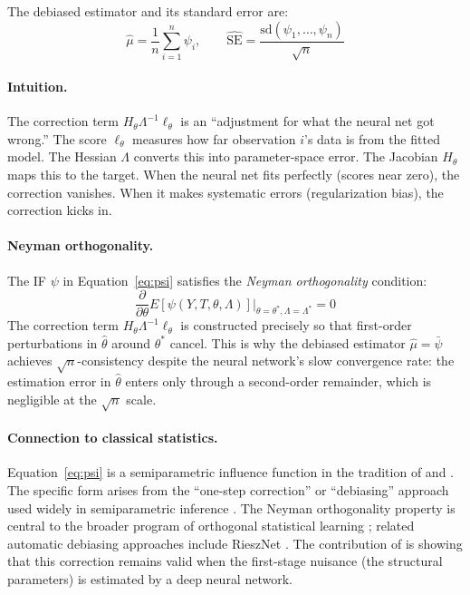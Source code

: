 The debiased estimator and its standard error are:
\begin{equation}\label{eq:mu_hat}
    \hat{\mu} = \frac{1}{n}\sum_{i=1}^n \psi_i, \qquad \widehat{\text{SE}} = \frac{\text{sd}(\psi_1, \ldots, \psi_n)}{\sqrt{n}}
\end{equation}

\paragraph{Intuition.} The correction term $H_{\theta} \Lambda^{-1} \ell_\theta$ is an ``adjustment for what the neural net got wrong.'' The score $\ell_\theta$ measures how far observation $i$'s data is from the fitted model. The Hessian $\Lambda$ converts this into parameter-space error. The Jacobian $H_\theta$ maps this to the target. When the neural net fits perfectly (scores near zero), the correction vanishes. When it makes systematic errors (regularization bias), the correction kicks in.

\paragraph{Neyman orthogonality.} The IF $\psi$ in Equation~\eqref{eq:psi} satisfies the \emph{Neyman orthogonality} condition:
\begin{equation}\label{eq:neyman_orth}
    \frac{\partial}{\partial \theta} E[\psi(Y, T, \theta, \Lambda)] \bigg|_{\theta = \theta^*, \Lambda = \Lambda^*} = 0
\end{equation}
The correction term $H_\theta \Lambda^{-1} \ell_\theta$ is constructed precisely so that first-order perturbations in $\hat{\theta}$ around $\theta^*$ cancel. This is why the debiased estimator $\hat{\mu} = \bar{\psi}$ achieves $\sqrt{n}$-consistency despite the neural network's slow convergence rate: the estimation error in $\hat{\theta}$ enters only through a second-order remainder, which is negligible at the $\sqrt{n}$ scale.

\paragraph{Connection to classical statistics.} Equation~\eqref{eq:psi} is a semiparametric influence function in the tradition of \citet{hampel1974influence} and \citet{newey1994large}. The specific form arises from the ``one-step correction'' or ``debiasing'' approach used widely in semiparametric inference \citep{chernozhukov2018double}. The Neyman orthogonality property is central to the broader program of orthogonal statistical learning \citep{foster2023orthogonal}; related automatic debiasing approaches include RieszNet \citep{chernozhukov2022riesznet}. The contribution of \citet{farrell2021deep, farrell2025deep} is showing that this correction remains valid when the first-stage nuisance (the structural parameters) is estimated by a deep neural network.

